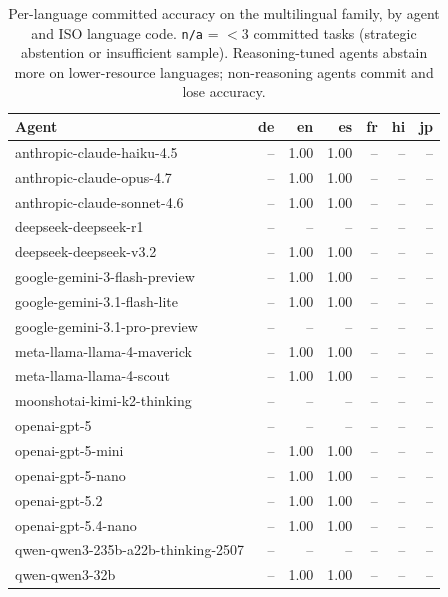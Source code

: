 \begin{table}[t]\centering\small
\caption{Per-language committed accuracy on the multilingual family, by agent and ISO language code. \texttt{n/a} = $<3$ committed tasks (strategic abstention or insufficient sample). Reasoning-tuned agents abstain more on lower-resource languages; non-reasoning agents commit and lose accuracy.}
\label{tab:multilingual-per-lang}
\begin{tabular}{lrrrrrr}
\toprule
Agent & de & en & es & fr & hi & jp \\
\midrule
anthropic-claude-haiku-4.5 & -- & 1.00 & 1.00 & -- & -- & -- \\
anthropic-claude-opus-4.7 & -- & 1.00 & 1.00 & -- & -- & -- \\
anthropic-claude-sonnet-4.6 & -- & 1.00 & 1.00 & -- & -- & -- \\
deepseek-deepseek-r1 & -- & -- & -- & -- & -- & -- \\
deepseek-deepseek-v3.2 & -- & 1.00 & 1.00 & -- & -- & -- \\
google-gemini-3-flash-preview & -- & 1.00 & 1.00 & -- & -- & -- \\
google-gemini-3.1-flash-lite & -- & 1.00 & 1.00 & -- & -- & -- \\
google-gemini-3.1-pro-preview & -- & -- & -- & -- & -- & -- \\
meta-llama-llama-4-maverick & -- & 1.00 & 1.00 & -- & -- & -- \\
meta-llama-llama-4-scout & -- & 1.00 & 1.00 & -- & -- & -- \\
moonshotai-kimi-k2-thinking & -- & -- & -- & -- & -- & -- \\
openai-gpt-5 & -- & -- & -- & -- & -- & -- \\
openai-gpt-5-mini & -- & 1.00 & 1.00 & -- & -- & -- \\
openai-gpt-5-nano & -- & 1.00 & 1.00 & -- & -- & -- \\
openai-gpt-5.2 & -- & 1.00 & 1.00 & -- & -- & -- \\
openai-gpt-5.4-nano & -- & 1.00 & 1.00 & -- & -- & -- \\
qwen-qwen3-235b-a22b-thinking-2507 & -- & -- & -- & -- & -- & -- \\
qwen-qwen3-32b & -- & 1.00 & 1.00 & -- & -- & -- \\
\bottomrule
\end{tabular}
\end{table}